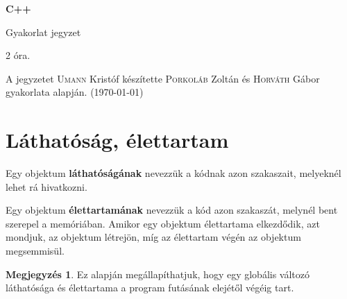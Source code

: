 \documentclass[a4paper,11.5pt]{article}
\begin{document}
	\setlength\parindent{0pt}
	\def\s{\hspace{0.2mm}\vphantom{\beta}}
	\def\Z{\mathbb{Z}}
	\def\Q{\mathbb{Q}}
	\def\R{\mathbb{R}}
	\def\C{\mathbb{C}}
	\def\N{\mathbb{N}}
	\def\Ra{\overline{\mathbb{R}}}
	
	\def\sume{\displaystyle\sum_{n=1}^{+\infty}}
	\def\sumn{\displaystyle\sum_{n=0}^{+\infty}}
	
	\def\narrow{\underset{n\rightarrow+\infty}{\longrightarrow}}
	\def\limn{\displaystyle\lim_{n\to +\infty}}
	\def\limx{\displaystyle\lim_{x\to +\infty}}
	
	\theoremstyle{definition}
	\newtheorem{theorem}{Tétel}[subsection] 
	
	\theoremstyle{definition}
	\newtheorem{definition}[theorem]{Definíció} 
	\newtheorem{example}[theorem]{Példa} 
	\newtheorem{task}[theorem]{Feladat} 
	\newtheorem{note}[theorem]{Megjegyzés}
	\begin{center}
		{\LARGE\textbf{C++}}
		
		{\Large Gyakorlat jegyzet}
		
		2 óra.
	\end{center}
	A jegyzetet \textsc{Umann} Kristóf készítette \textsc{Porkoláb} Zoltán és \textsc{Horváth} Gábor gyakorlata alapján. (\today)
	
	
	
	\section{Láthatóság, élettartam}
	Egy objektum \textbf{láthatóságának} nevezzük a kódnak azon szakaszait, melyeknél lehet rá hivatkozni.
	\smallskip
	
	Egy objektum \textbf{élettartamának} nevezzük a kód azon szakaszát, melynél bent szerepel a memóriában. Amikor egy objektum élettartama elkezdődik, azt mondjuk, az objektum létrejön, míg az élettartam végén az objektum megsemmisül.
	\medskip
	\begin{note}
		Ez alapján megállapíthatjuk, hogy egy globális változó láthatósága és élettartama a program futásának elejétől végéig tart.
	\end{note}
	
\end{document}
